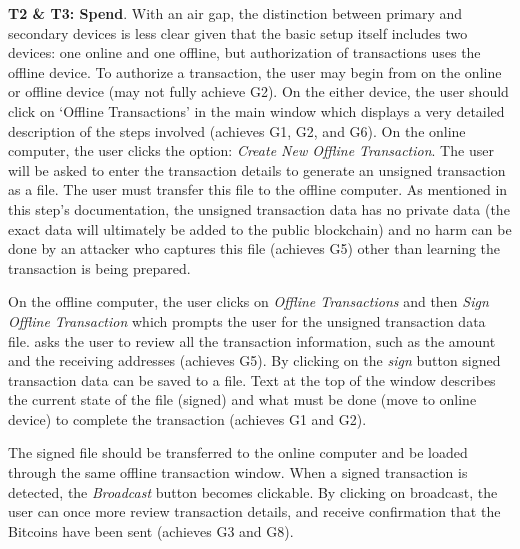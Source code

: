 \textbf{T2 \& T3: Spend}.
With an air gap, the distinction between primary and secondary devices is less clear given that the basic setup itself includes two devices: one online and one offline, but authorization of transactions uses the offline device. To authorize a transaction, the user may begin from \armory on the online or offline device (may not fully achieve G2). On the either device, the user should click on `Offline Transactions' in the main window which displays a very detailed description of the steps involved (achieves G1, G2, and G6). On the online computer, the user clicks the option: \emph{Create New Offline Transaction}. The user will be asked to enter the transaction details to generate an unsigned transaction as a file. The user must transfer this file to the offline computer. As mentioned in this step's documentation, the unsigned transaction data has no private data (the exact data will ultimately be added to the public blockchain) and no harm can be done by an attacker who captures this file (achieves G5) other than learning the transaction is being prepared.

On the offline computer, the user clicks on \textit{Offline Transactions} and then \emph{Sign Offline Transaction} which prompts the user for the unsigned transaction data file. \armory asks the user to review all the transaction information, such as the amount and the receiving addresses (achieves G5). By clicking on the \textit{sign} button signed transaction data can be saved to a file. Text at the top of the window describes the current state of the file (signed) and what must be done (move to online device) to complete the transaction (achieves G1 and G2).

The signed file should be transferred to the online computer and be loaded through the same offline transaction window. When a signed transaction is detected, the \emph{Broadcast} button becomes clickable. By clicking on broadcast, the user can once more review transaction details, and receive confirmation that the Bitcoins have been sent (achieves G3 and G8).

